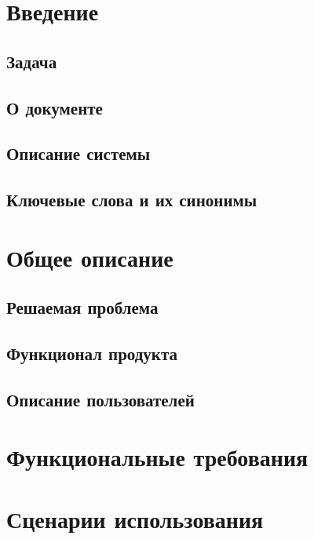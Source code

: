 \documentclass[12pt]{article}
\begin{document}


\tableofcontents

\section{Введение}

\subsection{Задача}


\subsection{О документе}


\subsection{Описание системы}


\subsection{Ключевые слова и их синонимы}


\section{Общее описание}

\subsection{Решаемая проблема}


\subsection{Функционал продукта}


\subsection{Описание пользователей}


\section{Функциональные требования}


\section{Сценарии использования}




\end{document}
